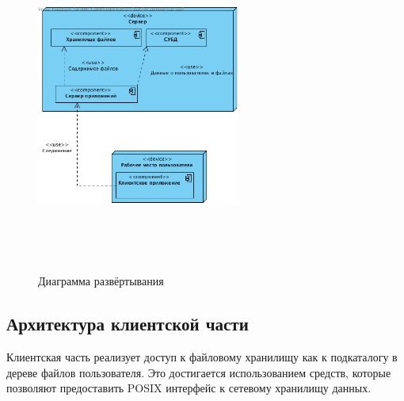 \documentclass[utf8,usehyperref,12pt]{G7-32}
\begin{document}
\begin{figure}[ht]
   \centering%
   \includegraphics[height=110mm, width=0.6\textwidth, clip, keepaspectratio]{pictures/Deploy}
   \caption{Диаграмма развёртывания}\label{fig:deploy}
 \end{figure}
 
 
\subsection{Архитектура клиентской части}

Клиентская часть реализует доступ к файловому хранилищу как к подкаталогу в дереве файлов пользователя. Это достигается использованием средств, которые позволяют предоставить POSIX интерфейс к сетевому хранилищу данных.
\end{document}
